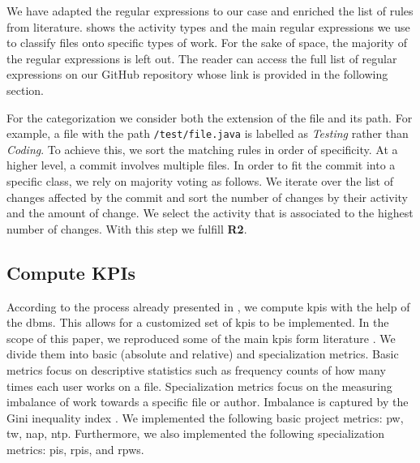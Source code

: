 

We have adapted the regular expressions to our case and enriched the list of rules from literature.  shows the activity types and the main regular expressions we use to classify files onto specific types of work. For the sake of space, the majority of the regular expressions is left out. The reader can access the full list of regular expressions on our GitHub repository whose link is provided in the following section.


For the categorization we consider both the extension of the file and its path. For example, a file with the path \lstinline{/test/file.java} is labelled as \textsl{Testing} rather than \textsl{Coding}. To achieve this, we sort the matching rules in order of specificity. 
At a higher level, a commit involves multiple files. In order to fit the commit into a specific class, we rely on majority voting as follows. We iterate over the list of changes affected by the commit and sort the number of changes by their activity and the amount of change. We select the activity that is associated to the highest number of changes. With this step we fulfill \textbf{R2}.

\subsection{Compute KPIs}

According to the process already presented in , we compute \glspl{kpi} with the help of the \gls{dbms}. This allows for a customized set of \glspl{kpi} to be implemented. In the scope of this paper, we reproduced some of the main \glspl{kpi} form literature \citep{DBLP:journals/ese/VasilescuSGM14}. We divide them into basic (absolute and relative) and specialization metrics. Basic metrics focus on descriptive statistics such as frequency counts of how many times each user works on a file. Specialization metrics focus on the measuring imbalance of work towards a specific file or author. Imbalance is captured by the Gini inequality index \citep{gini1921measurement}.
We implemented the following basic project metrics: \gls{pw}, \gls{tw}, \gls{nap}, \gls{ntp}. Furthermore, we also implemented the following specialization metrics: \gls{pis}, \gls{rpis}, and \gls{rpws}. 

